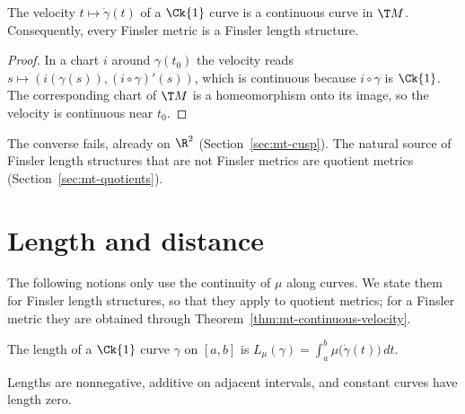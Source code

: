 \begin{theorem}
  \label{thm:mt-continuous-velocity}
  \leanok
  The velocity $t \mapsto \dot\gamma(t)$ of a $\Ck{1}$ curve is a continuous curve in $\T M$.
  Consequently, every Finsler metric is a Finsler length structure.
\end{theorem}

\begin{proof}
  \leanok
  In a chart $i$ around $\gamma(t_0)$ the velocity reads $s \mapsto (i(\gamma(s)), (i \circ
  \gamma)'(s))$, which is continuous because $i \circ \gamma$ is $\Ck{1}$. The corresponding chart
  of $\T M$ is a homeomorphism onto its image, so the velocity is continuous near $t_0$.
\end{proof}

The converse fails, already on $\R^2$ (Section~\ref{sec:mt-cusp}). The natural source of Finsler
length structures that are not Finsler metrics are quotient metrics (Section~\ref{sec:mt-quotients}).

\section{Length and distance}

The following notions only use the continuity of $\mu$ along curves. We state them for Finsler
length structures, so that they apply to quotient metrics; for a Finsler metric they are obtained
through Theorem~\ref{thm:mt-continuous-velocity}.

\begin{definition}[Length]
  \label{def:mt-length}
  \leanok
  The length of a $\Ck{1}$ curve $\gamma$ on $[a, b]$ is
  $L_\mu(\gamma) = \int_a^b \mu\bigl(\dot\gamma(t)\bigr)\, dt$.
\end{definition}

\begin{proposition}
  \label{prop:mt-length}
  \leanok
  Lengths are nonnegative, additive on adjacent intervals, and constant curves have length zero.
\end{proposition}

